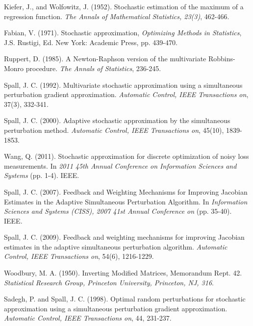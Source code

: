\documentclass[conference,10.6cpt]{IEEEtran}
\newcommand{\remove}[1]{}
\begin{document}
\begin{thebibliography}{1}
	
	Kiefer, J., and Wolfowitz, J. (1952). Stochastic estimation of the maximum of a regression function.\textit{ The Annals of Mathematical Statistics, 23(3)}, 462-466.
	
	Fabian, V. (1971). Stochastic approximation, \textit{Optimizing Methods in Statistics}, J.S. Rustigi, Ed. New York: Academic Press, pp. 439-470.
	
	Ruppert, D. (1985). A Newton-Raphson version of the multivariate Robbins-Monro procedure. \textit{The Annals of Statistics}, 236-245.

 Spall, J. C. (1992). Multivariate
  stochastic approximation using a simultaneous perturbation gradient
  approximation. \textit{Automatic Control, IEEE Transactions on},
  37(3), 332-341.

 Spall, J. C. (2000). Adaptive
  stochastic approximation by the simultaneous perturbation
  method. \textit{Automatic Control, IEEE Transactions on}, 45(10),
  1839-1853.


Wang, Q. (2011). Stochastic approximation for discrete optimization of noisy loss measurements. In \textit{2011 45th Annual Conference on Information Sciences and Systems} (pp. 1-4).  IEEE.



Spall, J. C. (2007). Feedback and Weighting Mechanisms for Improving Jacobian Estimates in the Adaptive Simultaneous Perturbation Algorithm. In \textit{Information Sciences and Systems (CISS), 2007 41st Annual Conference on} (pp. 35-40). IEEE.


 Spall, J. C. (2009). Feedback and
  weighting mechanisms for improving Jacobian estimates in the adaptive
  simultaneous perturbation algorithm. \textit{Automatic Control, IEEE
    Transactions on}, 54(6), 1216-1229.


 Woodbury,
  M. A. (1950). Inverting Modified Matrices, Memorandum
  Rept. 42. \textit{Statistical Research Group, Princeton University,
    Princeton, NJ, 316}.

\remove
{
	\bibitem{Bar-Itzhack1998} Bar-Itzhack,
	I.Y. (1998). Matrix symmetrization. \textit{Journal of guidance,
		control, and dynamics}, 21(1), 178-179.
	}


 Sadegh, P. and Spall,
  J. C. (1998). Optimal random perturbations for stochastic
  approximation using a simultaneous perturbation gradient
  approximation. \textit{Automatic Control, IEEE Transactions on}, 44,
  231-237.


\end{thebibliography}
\end{document}
